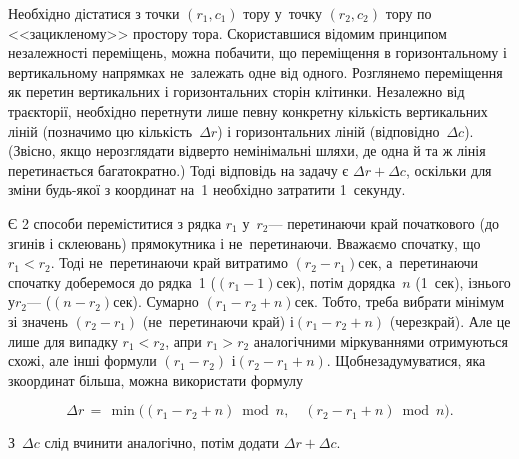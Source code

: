 {

\Tutorial	Необхідно дістатися з точки $(r_1, c_1)$ тору у~точку $(r_2, c_2)$ тору по <<зацикленому>> простору тора. 
Скориставшися відомим принципом незалежності переміщень, можна побачити, що переміщення в горизонтальному і вертикальному напрямках не~залежать одне від одного. Розглянемо переміщення як перетин вертикальних і горизонтальних сторін клітинки. Незалежно від траєкторії, необхідно перетнути лише певну конкретну кількість вертикальних ліній (позначимо цю кількість~$\Delta{}r$) і горизонтальних ліній (відповідно~$\Delta{}c$). (Звісно, якщо не\nolinebreak[3] розглядати відверто не\nolinebreak[3] мінімальні шляхи, де одна й та ж лінія перетинається багатократно.) Тоді відповідь на задачу є ${\Delta{}r+\Delta{}c}$, оскільки для зміни будь-якої з координат на~1 необхідно затратити 1~секунду.

Є 2 способи переміститися з рядка $r_1$ у~$r_2$\nolinebreak[3] --- перетинаючи край початкового (до згинів і склеювань) прямокутника і не~перетинаючи. Вважаємо спочатку, що ${r_1{<}r_2}$. Тоді не~перетинаючи край витратимо ${(r_2{-}r_1)}$\nolinebreak[2] сек, а~перетинаючи спочатку доберемося до рядка~1 (${(r_1{-}1)}$\nolinebreak[2] сек),  потім до\nolinebreak[1] рядка~$n$ (1~сек), і\nolinebreak[2] з\nolinebreak[2] нього у\nolinebreak[3] $r_2$\nolinebreak[3] --- (${(n{-}r_2)}$\nolinebreak[2] сек). Сумарно ${(r_1{-}r_2{+}n)}$\nolinebreak[2] сек. 
Тобто, треба вибрати мінімум зі значень ${(r_2{-}r_1)}$ (не~перетинаючи край) і\nolinebreak[3] ${(r_1{-}r_2{+}n)}$ (через\nolinebreak[3] край). Але це лише для випадку ${r_1{<}r_2}$, а\nolinebreak[3] при ${r_1{>}r_2}$ аналогічними міркуваннями отримуються схожі, але інші формули ${(r_1{-}r_2)}$ і\nolinebreak[3] ${(r_2{-}r_1{+}n)}$. Щоб\nolinebreak[2] не\nolinebreak[2] задумуватися, яка з\nolinebreak[3] координат більша, можна використати формулу

\vspace{-\baselineskip}

$$
\Delta{}r \, = \, \min\bigl((r_1-r_2+n) \bmod n,\quad (r_2-r_1+n) \bmod n\bigr).
$$

\vspace{-0.5\baselineskip}

\noindent
З~$\Delta{}c$ слід вчинити аналогічно, потім додати ${\Delta{}r+\Delta{}c}$.

}